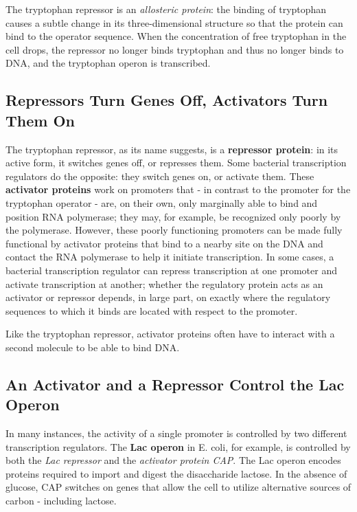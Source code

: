 The tryptophan repressor is an \textit{allosteric protein}: the
binding of tryptophan causes a subtle change in its three-dimensional
structure so that the protein can bind to the operator sequence. When
the concentration of free tryptophan in the cell drops, the repressor no
longer binds tryptophan and thus no longer binds to DNA, and the tryptophan
operon is transcribed.

\subsection{Repressors Turn Genes Off, Activators Turn Them On}

The tryptophan repressor, as its name suggests, is a \textbf{repressor protein}:
in its active form, it switches genes off, or represses them. Some bacterial
transcription regulators do the opposite: they switch genes on, or activate
them. These \textbf{activator proteins} work on promoters that - in contrast to
the promoter for the tryptophan operator - are, on their own, only marginally
able to bind and position RNA polymerase; they may, for example,
be recognized only poorly by the polymerase. However, these poorly
functioning promoters can be made fully functional by activator proteins
that bind to a nearby site on the DNA and contact the RNA polymerase to
help it initiate transcription. In some cases, a bacterial transcription
regulator can repress transcription at one promoter and activate
transcription at another; whether the regulatory protein acts as an activator
or repressor depends, in large part, on exactly where the regulatory
sequences to which it binds are located with respect to the promoter.

Like the tryptophan repressor, activator proteins often have to interact
with a second molecule to be able to bind DNA.

\subsection{An Activator and a Repressor Control the Lac Operon}

In many instances, the activity of a single promoter is controlled by two
different transcription regulators. The \textbf{Lac operon} in E. coli, for example,
is controlled by both the \textit{Lac repressor} and the \textit{activator protein CAP}. The
Lac operon encodes proteins required to import and digest the disaccharide
lactose. In the absence of glucose, CAP switches on genes that
allow the cell to utilize alternative sources of carbon - including lactose.

